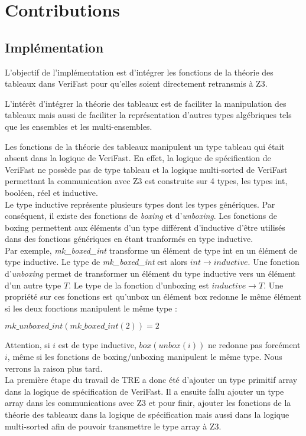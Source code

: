 \documentclass[11pt,openany]{article}
\newcommand{\verifast}{VeriFast}
\begin{document}
\section{Contributions}
	\subsection{Impl\'ementation}
	L'objectif de l'impl\'ementation est d'int\'egrer les fonctions de la th\'eorie des tableaux dans \verifast{} pour qu'elles soient directement retransmis \`a Z3.\par 
	L'int\'er\^et d'int\'egrer la th\'eorie des tableaux est de faciliter la manipulation des tableaux mais aussi de faciliter la repr\'esentation d'autres types alg\'ebriques tels que les ensembles et les multi-ensembles.\par
	Les fonctions de la th\'eorie des tableaux manipulent un type tableau qui \'etait absent dans la logique de \verifast{}. En effet, la logique de sp\'ecification de \verifast{} ne poss\`ede pas de type tableau et la logique multi-sorted de \verifast{} permettant la communication avec Z3 est construite sur 4 types, les types int, bool\'een, r\'eel et inductive.\\
	Le type inductive repr\'esente plusieurs types dont les types g\'en\'eriques. Par cons\'equent, il existe des fonctions de \textit{boxing} et d'\textit{unboxing}. Les fonctions de boxing permettent aux \'el\'ements d'un type diff\'erent d'inductive d'\^etre utilis\'es dans des fonctions g\'en\'eriques en \'etant tranform\'es en type inductive. \\Par exemple, \textit{mk_boxed_int} transforme un \'el\'ement de type int en un \'el\'ement de type inductive. Le type de \textit{mk_boxed_int} est alors $int \rightarrow inductive$. Une fonction d'\textit{unboxing} permet de transformer un \'el\'ement du type inductive vers un \'el\'ement d'un autre type $T$. Le type de la fonction d'unboxing est $inductive \rightarrow T$. Une propri\'et\'e sur ces fonctions est qu'unbox un \'el\'ement box redonne le m\^eme \'el\'ement si les deux fonctions manipulent le m\^eme type :
	\begin{center}
		$mk\_unboxed\_int(mk\_boxed\_int(2)) = 2$
	\end{center}
	Attention, si $i$ est de type inductive, $box(unbox(i))$ ne redonne pas forc\'ement $i$, m\^eme si les fonctions de boxing/unboxing manipulent le m\^eme type. Nous verrons la raison plus tard.\\ 
	La premi\`ere \'etape du travail de TRE a donc \'et\'e d'ajouter un type primitif array dans la logique de sp\'ecification de \verifast{}. Il a ensuite fallu ajouter un type array dans les communications avec Z3 et pour finir, ajouter les fonctions de la th\'eorie des tableaux dans la logique de sp\'ecification mais aussi dans la logique multi-sorted afin de pouvoir transmettre le type array \`a Z3.
\end{document}
